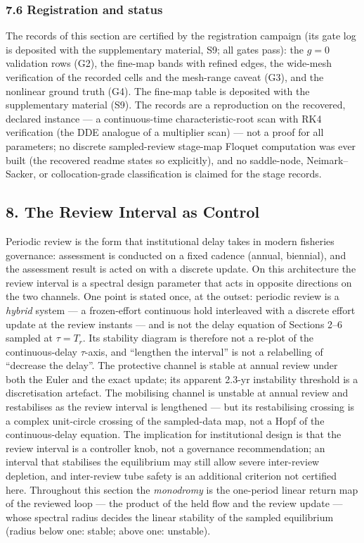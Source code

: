 \documentclass[11pt]{article}
\begin{document}
\subsubsection{7.6 Registration and
status}\label{registration-and-status}

The records of this section are certified by the registration campaign
(its gate log is deposited with the supplementary material, S9; all
gates pass): the \(g = 0\) validation rows (G2), the fine-map bands with
refined edges, the wide-mesh verification of the recorded cells and the
mesh-range caveat (G3), and the nonlinear ground truth (G4). The
fine-map table is deposited with the supplementary material (S9). The
records are a reproduction on the recovered, declared instance --- a
continuous-time characteristic-root scan with RK4 verification (the DDE
analogue of a multiplier scan) --- not a proof for all parameters; no
discrete sampled-review stage-map Floquet computation was ever built
(the recovered readme states so explicitly), and no saddle-node,
Neimark--Sacker, or collocation-grade classification is claimed for the
stage records.

\subsection{8. The Review Interval as
Control}\label{the-review-interval-as-control}

Periodic review is the form that institutional delay takes in modern
fisheries governance: assessment is conducted on a fixed cadence
(annual, biennial), and the assessment result is acted on with a
discrete update. On this architecture the review interval is a spectral
design parameter that acts in opposite directions on the two channels.
One point is stated once, at the outset: periodic review is a
\emph{hybrid} system --- a frozen-effort continuous hold interleaved
with a discrete effort update at the review instants --- and is not the
delay equation of Sections 2--6 sampled at \(\tau = T_r\). Its stability
diagram is therefore not a re-plot of the continuous-delay
\(\tau\)-axis, and ``lengthen the interval'' is not a relabelling of
``decrease the delay''. The protective channel is stable at annual
review under both the Euler and the exact update; its apparent 2.3-yr
instability threshold is a discretisation artefact. The mobilising
channel is unstable at annual review and restabilises as the review
interval is lengthened --- but its restabilising crossing is a complex
unit-circle crossing of the sampled-data map, not a Hopf of the
continuous-delay equation. The implication for institutional design is
that the review interval is a controller knob, not a governance
recommendation; an interval that stabilises the equilibrium may still
allow severe inter-review depletion, and inter-review tube safety is an
additional criterion not certified here. Throughout this section the
\emph{monodromy} is the one-period linear return map of the reviewed
loop --- the product of the held flow and the review update --- whose
spectral radius decides the linear stability of the sampled equilibrium
(radius below one: stable; above one: unstable).
\end{document}
